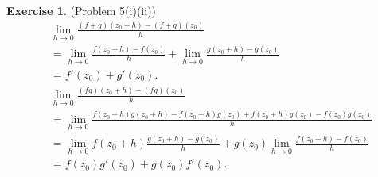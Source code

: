 \documentclass[12pt, psamsfonts]{amsart}
\theoremstyle{definition}
\newtheorem*{exer}{Exercise}
\theoremstyle{remark}
\numberwithin{equation}{section}
\begin{document}
\begin{exer}{(Problem 5(i)(ii))}
  \begin{align*}
    &\lim_{h \rightarrow 0} \frac{(f + g)(z_0 + h) - (f + g)(z_0)}{h} \\
      &= \lim_{h \rightarrow 0} \frac{f(z_0 + h) - f(z_0)}{h} + \lim_{h \rightarrow 0} \frac{g(z_0 + h) - g(z_0)}{h} \\
      &= f'(z_0) + g'(z_0). \\
    &\lim_{h \rightarrow 0} \frac{(fg)(z_0 + h) - (fg)(z_0)}{h} \\
      &= \lim_{h \rightarrow 0} \frac{f(z_0 + h)g(z_0 + h) - f(z_0 + h)g(z_0) + f(z_0 + h)g(z_0) - f(z_0)g(z_0)}{h} \\
      &= \lim_{h \rightarrow 0} f(z_0 + h)\frac{g(z_0 + h) - g(z_0)}{h} + g(z_0)\lim_{h \rightarrow 0}\frac{f(z_0 + h) - f(z_0)}{h} \\
      &= f(z_0)g'(z_0) + g(z_0)f'(z_0).
  \end{align*}
\end{exer}
\end{document}
